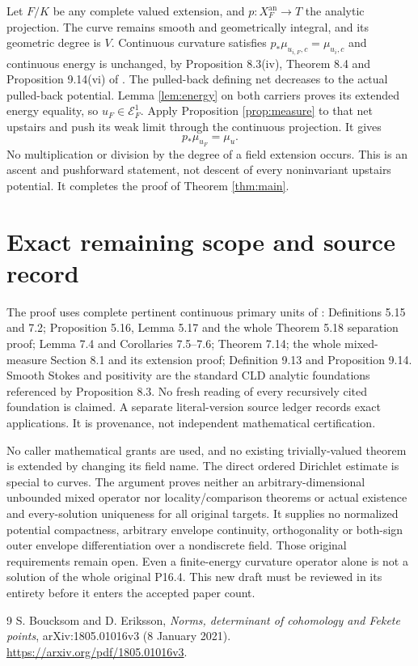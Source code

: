 \documentclass[11pt]{article}
\newcommand{\an}{\mathrm{an}}
\newcommand{\E}{\mathcal E}
\begin{document}
Let $F/K$ be any complete valued extension, and
$p:X_F^{\an}\to T$ the analytic projection. The curve remains
smooth and geometrically integral, and its geometric degree is $V$.
Continuous curvature satisfies $p_*\mu_{u_{i,F},c}=\mu_{u_i,c}$
and continuous energy is unchanged, by Proposition 8.3(iv),
Theorem 8.4 and Proposition 9.14(vi) of \cite{BE}.
The pulled-back defining net decreases to the actual pulled-back
potential. Lemma \ref{lem:energy} on both carriers proves its
extended energy equality, so $u_F\in\E^1_F$.
Apply Proposition \ref{prop:measure} to that net upstairs and
push its weak limit through the continuous projection. It gives
\[
 p_*\mu_{u_F}=\mu_u.
\]
No multiplication or division by the degree of a field extension
occurs. This is an ascent and pushforward statement, not descent
of every noninvariant upstairs potential. It completes the proof
of Theorem \ref{thm:main}.

\section{Exact remaining scope and source record}

The proof uses complete pertinent continuous primary units of
\cite{BE}: Definitions 5.15 and 7.2; Proposition 5.16, Lemma 5.17
and the whole Theorem 5.18 separation proof; Lemma 7.4 and
Corollaries 7.5--7.6; Theorem 7.14; the whole mixed-measure
Section 8.1 and its extension proof; Definition 9.13 and
Proposition 9.14. Smooth Stokes and positivity are the standard
CLD analytic foundations referenced by Proposition 8.3. No fresh
reading of every recursively cited foundation is claimed. A
separate literal-version source ledger records exact applications.
It is provenance, not independent mathematical certification.

No caller mathematical grants are used, and no existing
trivially-valued theorem is extended by changing its field name.
The direct ordered Dirichlet estimate is special to curves.
The argument proves neither an arbitrary-dimensional unbounded
mixed operator nor locality/comparison theorems or actual
existence and every-solution uniqueness for all original targets.
It supplies no normalized potential compactness, arbitrary envelope
continuity, orthogonality or both-sign outer envelope differentiation
over a nondiscrete field. Those original requirements remain open.
Even a finite-energy curvature operator alone is not a solution of
the whole original P16.4. This new draft must be reviewed in its
entirety before it enters the accepted paper count.

\begin{thebibliography}{9}
 S. Boucksom and D. Eriksson,
\emph{Norms, determinant of cohomology and Fekete points},
arXiv:1805.01016v3 (8 January 2021).
\url{https://arxiv.org/pdf/1805.01016v3}.
\end{thebibliography}
\end{document}
